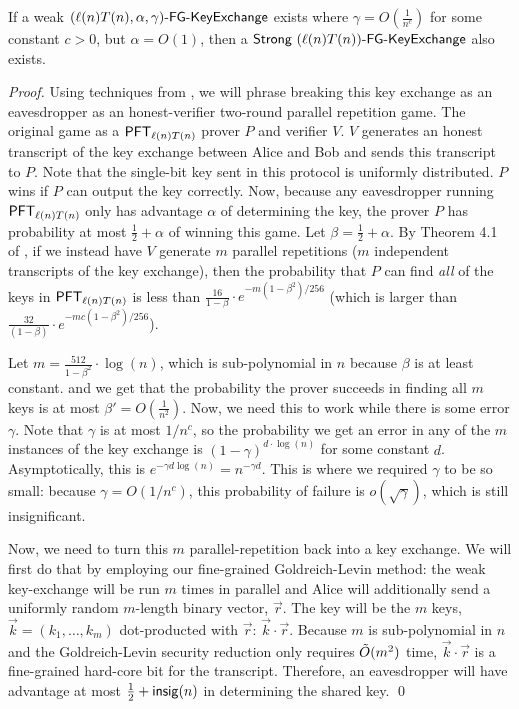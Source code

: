 \begin{theorem}\label{thm:amplifyKeyXC}
	If a weak $\fgkeyxc{\ell(n)T(n)}{\alpha}{\gamma}$ exists where $\gamma = O\left(\frac{1}{n^c}\right)$ for some constant $c>0$, but $\alpha = O(1)$, then a $\strongfgkeyxc{\ell(n)T(n)}$ also exists.
\end{theorem}
\begin{proof}
	Using techniques from \cite{BIN97}, we will phrase breaking this key exchange as an eavesdropper as an honest-verifier two-round parallel repetition game. The original game as a $\PFT{\ell(n)T(n)}$ prover $P$ and verifier $V$. $V$ generates an honest transcript of the key exchange between Alice and Bob and sends this transcript to $P$. Note that the single-bit key sent in this protocol is uniformly distributed. $P$ wins if $P$ can output the key correctly. Now, because any eavesdropper running $\PFT{\ell(n)T(n)}$ only has advantage $\alpha$ of determining the key, the prover $P$ has probability at most $\frac 1 2 + \alpha$ of winning this game. Let $\beta = \frac 1 2 + \alpha$. By Theorem 4.1 of \cite{BIN97}, if we instead have $V$ generate $m$ parallel repetitions ($m$ independent transcripts of the key exchange), then the probability that $P$ can find \emph{all} of the keys in $\PFT{\ell(n)T(n)}$ is less than $\frac{16}{1 - \beta} \cdot e^{-m (1 - \beta^2)/256}$ (which is larger than $\frac{32}{(1 - \beta)} \cdot e^{-mc(1 - \beta^2) / 256}$).
	
	Let $m = \frac{512}{1 - \beta^2} \cdot \log(n)$, which is sub-polynomial in $n$ because $\beta$ is at least constant. and we get that the probability the prover succeeds in finding all $m$ keys is at most $\beta' = O\left( \frac{1}{n^2} \right)$. Now, we need this to work while there is some error $\gamma$. Note that $\gamma$ is at most $1/n^c$, so the probability we get an error in any of the $m$ instances of the key exchange is $\left( 1 - \gamma \right)^{d\cdot \log(n)}$ for some constant $d$. Asymptotically, this is $e^{-\gamma d \log(n)} = n^{-\gamma d}$. This is where we required $\gamma$ to be so small: because $\gamma = O(1/n^c)$, this probability of failure is $o(\sqrt{\gamma})$, which is still insignificant.
	
	Now, we need to turn this $m$ parallel-repetition back into a key exchange. We will first do that by employing our fine-grained Goldreich-Levin method: the weak key-exchange will be run $m$ times in parallel and Alice will additionally send a uniformly random $m$-length binary vector, $\vec r$. The key will be the $m$ keys, $\vec k = (k_1, \ldots, k_m)$ dot-producted with $\vec r$: $\vec k \cdot \vec r$. Because $m$ is sub-polynomial in $n$ and the Goldreich-Levin security reduction only requires $\~O(m^2)$ time, $\vec k \cdot \vec r$ is a fine-grained hard-core bit for the transcript. Therefore, an eavesdropper will have advantage at most $\frac 1 2 + \insig(n)$ in determining the shared key.
\qed\end{proof}


